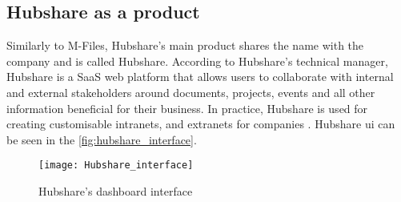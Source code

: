 \subsection{Hubshare as a product}\label{section:hubshare_as_a_product}
Similarly to M-Files, Hubshare's main product shares the name with the company and is called Hubshare. According to Hubshare's technical manager, Hubshare is a SaaS web platform that allows users to collaborate with internal and external stakeholders around documents, projects, events and all other information beneficial for their business. In practice, Hubshare is used for creating customisable intranets, and extranets for companies \cite{mfiles2022Hubshare}. Hubshare \gls{ui} can be seen in the \autoref{fig:hubshare_interface}.
\begin{figure}
	\centering
	\texttt{[image: Hubshare\_interface]}
	\caption{Hubshare's dashboard interface}
	\label{fig:hubshare_interface}
\end{figure}